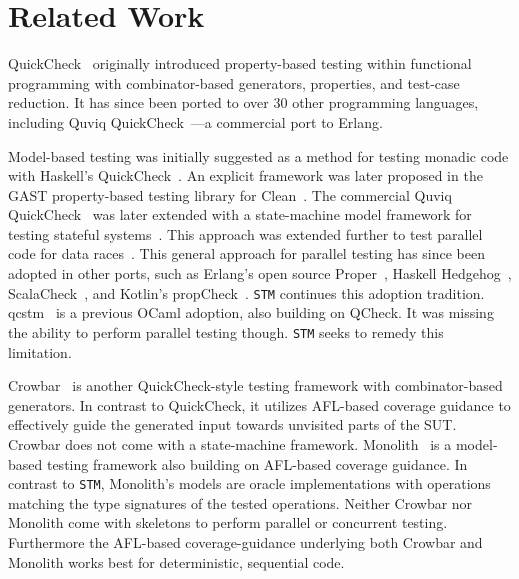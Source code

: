 \documentclass[twocolumn,10pt]{article}
\begin{document}
\vspace{-.8em}
\section{Related Work}

QuickCheck~\cite{claessenQuickCheckLightweightTool2000} originally introduced property-based
testing within functional programming with combinator-based
generators, properties, and test-case reduction. It has since been
ported to over 30 other programming languages, including Quviq
QuickCheck~\cite{QuviqQuickCheck}---a commercial port to Erlang.

Model-based testing was initially suggested as a method for testing
monadic code with Haskell's QuickCheck~\cite{claessenTestingMonadicCode2002}. An explicit
framework was later proposed in the GAST property-based testing
library for Clean~\cite{koopmanTestingReactiveSystems2003}. The commercial Quviq
QuickCheck~\cite{QuviqQuickCheck}
was later extended with a state-machine model framework for testing stateful
systems~\cite{artsTestingTelecomsSoftware2006}.
This approach was extended further to test parallel code for data
races~\cite{claessenFindingRaceConditions2009}.
This general approach for parallel testing has since been adopted in
other ports, such as Erlang's open source Proper~\cite{PropErTypes@Erlang-11}, Haskell
Hedgehog~\cite{Hedgehog}, ScalaCheck~\cite{ScalaCheck}, and Kotlin's
propCheck~\cite{PropCheck}. \texttt{STM} continues this adoption tradition.
qcstm~\cite{Midtgaard:OCaml20} is a previous OCaml adoption, also building on QCheck.
It was missing the ability to perform parallel testing though.
\texttt{STM} seeks to remedy this limitation.

Crowbar~\cite{dolanTestingCrowbar2017} is another QuickCheck-style
testing framework with combinator-based generators.  In contrast to
QuickCheck, it utilizes AFL-based coverage guidance to effectively
guide the generated input towards unvisited parts of the SUT. Crowbar
does not come with a state-machine
framework. Monolith~\cite{pottierStrongAutomatedTesting2021} is a
model-based testing framework also building on AFL-based coverage
guidance. In contrast to \texttt{STM}, Monolith's models are oracle
implementations with operations matching the type signatures of the
tested operations. Neither Crowbar nor Monolith come with skeletons to
perform parallel or concurrent testing. Furthermore the AFL-based
coverage-guidance underlying both Crowbar and Monolith works best for
deterministic, sequential code.
\end{document}
